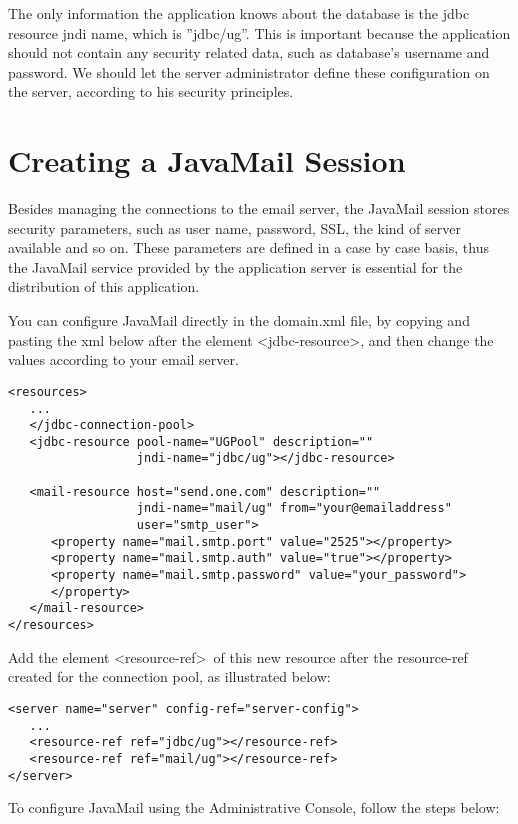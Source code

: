 \documentclass[envcountsame,envcountchap,letterpaper]{svmono}
\begin{document}
The only information the application knows about the database is the jdbc resource jndi name, which is ''jdbc/ug''. This is important because the application should not contain any security related data, such as database's username and password. We should let the server administrator define these configuration on the server, according to his security principles.

\section{Creating a JavaMail Session}

Besides managing the connections to the email server, the JavaMail session stores security parameters, such as user name, password, SSL, the kind of server available and so on. These parameters are defined in a case by case basis, thus the JavaMail service provided by the application server is essential for the distribution of this application.

You can configure JavaMail directly in the domain.xml file, by copying and pasting the xml below after the element \textless jdbc-resource\textgreater, and then change the values according to your email server.

\begin{verbatim}
<resources>
   ...
   </jdbc-connection-pool>
   <jdbc-resource pool-name="UGPool" description="" 
                  jndi-name="jdbc/ug"></jdbc-resource>

   <mail-resource host="send.one.com" description="" 
                  jndi-name="mail/ug" from="your@emailaddress"
                  user="smtp_user">
      <property name="mail.smtp.port" value="2525"></property>
      <property name="mail.smtp.auth" value="true"></property>
      <property name="mail.smtp.password" value="your_password">
      </property>
   </mail-resource>
</resources>
\end{verbatim}

Add the element \textless resource-ref\textgreater \ of this new resource after the resource-ref created for the connection pool, as illustrated below:

\begin{verbatim}
<server name="server" config-ref="server-config">
   ...
   <resource-ref ref="jdbc/ug"></resource-ref>
   <resource-ref ref="mail/ug"></resource-ref>
</server>
\end{verbatim}

To configure JavaMail using the Administrative Console, follow the steps below:
\end{document}
